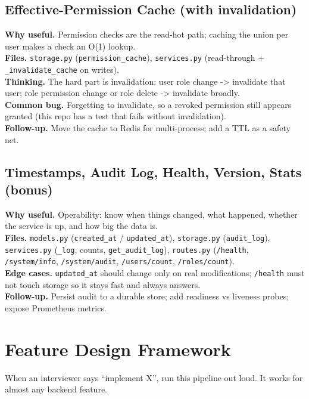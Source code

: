 \documentclass[11pt,a4paper]{report}
\begin{document}
\section{Effective-Permission Cache (with invalidation)}
\textbf{Why useful.} Permission checks are the read-hot path; caching the union
per user makes a check an O(1) lookup.\\
\textbf{Files.} \texttt{storage.py} (\texttt{permission\_cache}),
\texttt{services.py} (read-through + \texttt{\_invalidate\_cache} on writes).\\
\textbf{Thinking.} The hard part is invalidation: user role change -> invalidate
that user; role permission change or role delete -> invalidate broadly.\\
\textbf{Common bug.} Forgetting to invalidate, so a revoked permission still
appears granted (this repo has a test that fails without invalidation).\\
\textbf{Follow-up.} Move the cache to Redis for multi-process; add a TTL as a
safety net.

\section{Timestamps, Audit Log, Health, Version, Stats (bonus)}
\textbf{Why useful.} Operability: know when things changed, what happened, whether
the service is up, and how big the data is.\\
\textbf{Files.} \texttt{models.py} (\texttt{created\_at} / \texttt{updated\_at}),
\texttt{storage.py} (\texttt{audit\_log}), \texttt{services.py}
(\texttt{\_log}, counts, \texttt{get\_audit\_log}), \texttt{routes.py}
(\texttt{/health}, \texttt{/system/info}, \texttt{/system/audit},
\texttt{/users/count}, \texttt{/roles/count}).\\
\textbf{Edge cases.} \texttt{updated\_at} should change only on real
modifications; \texttt{/health} must not touch storage so it stays fast and
always answers.\\
\textbf{Follow-up.} Persist audit to a durable store; add readiness vs liveness
probes; expose Prometheus metrics.

\chapter{Feature Design Framework}

When an interviewer says ``implement X'', run this pipeline out loud. It works for
almost any backend feature.
\end{document}
